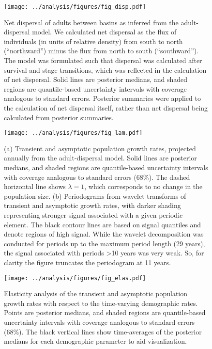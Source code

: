 \documentclass[11pt]{article}
\begin{document}
\clearpage
\begin{figure}
\centering
\texttt{[image: ../analysis/figures/fig\_disp.pdf]}
\caption{\label{fig:disp}
Net dispersal of adults between basins as inferred from the adult-dispersal model.
We calculated net dispersal as the flux of individuals (in units of relative density)
from south to north (``northward'') minus the flux from north to south (``southward'').
The model was formulated such that dispersal was calculated after survival and stage-transitions,
which was reflected in the calculation of net dispersal.
Solid lines are posterior medians,
and shaded regions are quantile-based uncertainty intervals
with coverage analogous to standard errors.
Posterior summaries were applied to the calculation of net dispersal itself,
rather than net dispersal being calculated from posterior summaries.
}
\end{figure}
\clearpage

\clearpage
\begin{figure}
\centering
\texttt{[image: ../analysis/figures/fig\_lam.pdf]}
\caption{\label{fig:lam}
(a) Transient and asymptotic population growth rates,
projected annually from the adult-dispersal model.
Solid lines are posterior medians,
and shaded regions are quantile-based uncertainty intervals
with coverage analogous to standard errors (68\%).
The dashed horizontal line shows $\lambda=1$,
which corresponds to no change in the population size.
(b) Periodograms from wavelet transforms of transient and asymptotic growth rates,
with darker shading representing stronger signal associated with a given periodic element.
The black contour lines are based on signal quantiles and denote regions of high signal.
While the wavelet decomposition was conducted for periods up to the maximum period length
(29 years), the signal associated with periods >10 years was very weak.
So, for clarity the figure truncates the periodogram at 11 years.
}
\end{figure}
\clearpage

\clearpage
\begin{figure}
\centering
\texttt{[image: ../analysis/figures/fig\_elas.pdf]}
\caption{\label{fig:elas}
Elasticity analysis of the transient and asymptotic population growth rates
with respect to the time-varying demographic rates.
Points are posterior medians,
and shaded regions are quantile-based uncertainty intervals
with coverage analogous to standard errors (68\%).
The black vertical lines show time-averages of the posterior medians
for each demographic parameter to aid visualization.
}
\end{figure}
\clearpage
\end{document}
